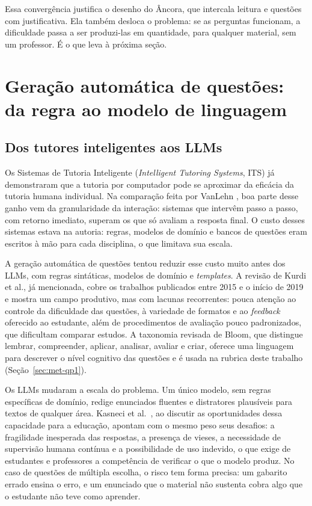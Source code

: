 \documentclass[portuguese,oneside]{tcc}
\newcommand{\ferramenta}{Âncora\xspace}
\newcommand{\estr}[1]{\emph{#1}}
\begin{document}
Essa convergência justifica o desenho do \ferramenta, que intercala leitura e questões com justificativa. Ela também desloca o problema: se as perguntas funcionam, a dificuldade passa a ser produzi-las em quantidade, para qualquer material, sem um professor. É o que leva à próxima seção.

\section{\label{sec:geracao}Geração automática de questões: da regra ao modelo de linguagem}

\subsection{Dos tutores inteligentes aos LLMs}

Os Sistemas de Tutoria Inteligente (\estr{Intelligent Tutoring Systems}, ITS) já demonstraram que a tutoria por computador pode se aproximar da eficácia da tutoria humana individual. Na comparação feita por VanLehn \cite{Van11}, boa parte desse ganho vem da granularidade da interação: sistemas que intervêm passo a passo, com retorno imediato, superam os que só avaliam a resposta final. O custo desses sistemas estava na autoria: regras, modelos de domínio e bancos de questões eram escritos à mão para cada disciplina, o que limitava sua escala.

A geração automática de questões tentou reduzir esse custo muito antes dos LLMs, com regras sintáticas, modelos de domínio e \estr{templates}. A revisão de Kurdi et al., já mencionada, cobre os trabalhos publicados entre 2015 e o início de 2019 e mostra um campo produtivo, mas com lacunas recorrentes: pouca atenção ao controle da dificuldade das questões, à variedade de formatos e ao \estr{feedback} oferecido ao estudante, além de procedimentos de avaliação pouco padronizados, que dificultam comparar estudos. A taxonomia revisada de Bloom, que distingue lembrar, compreender, aplicar, analisar, avaliar e criar, oferece uma linguagem para descrever o nível cognitivo das questões e é usada na rubrica deste trabalho (Seção~\ref{sec:met-qp1}).

Os LLMs mudaram a escala do problema. Um único modelo, sem regras específicas de domínio, redige enunciados fluentes e distratores plausíveis para textos de qualquer área. Kasneci et al.\ \cite{KSS23}, ao discutir as oportunidades dessa capacidade para a educação, apontam com o mesmo peso seus desafios: a fragilidade inesperada das respostas, a presença de vieses, a necessidade de supervisão humana contínua e a possibilidade de uso indevido, o que exige de estudantes e professores a competência de verificar o que o modelo produz. No caso de questões de múltipla escolha, o risco tem forma precisa: um gabarito errado ensina o erro, e um enunciado que o material não sustenta cobra algo que o estudante não teve como aprender.
\end{document}
